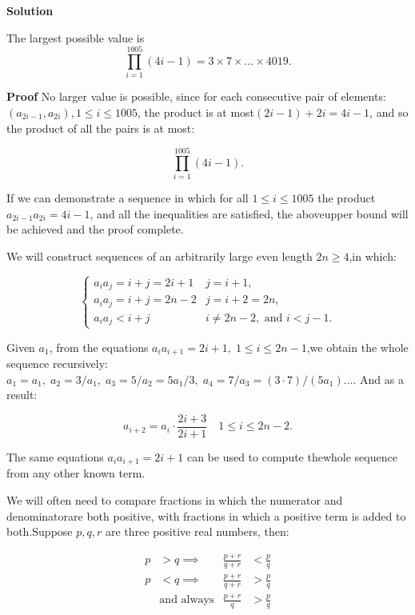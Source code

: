 \begin{enumerate}
 



\textbf{Solution}

The largest possible value is
 \[\prod_{i=1}^{1005}(4i-1) = 3\times 7 \times \ldots \times 4019.\]

 \textbf{Proof} No larger value is possible, since for each consecutive pair of elements:$(a_{2i-1},a_{2i}), 1\le i \le 1005$, the product is at most$(2i-1) + 2i = 4i - 1$, and so the product of all the pairs is at most:

 
 \[\prod_{i=1}^{1005}(4i-1).\]

 

 If we can demonstrate a sequence in which for all $1 \le i \le 1005$ the product$a_{2i-1}a_{2i} = 4i-1$, and all the inequalities are satisfied, the aboveupper bound will be achieved and the proof complete.

 We will construct sequences of an arbitrarily large even length $2n \ge 4$,in which:

 
 \[\begin{cases}   a_ia_j = i+j = 2i+1 & j=i+1, \\   a_ia_j = i+j = 2n-2 & j = i+2 = 2n, \\   a_ia_j < i+j            & i \ne 2n-2, \mbox{ and } i < j-1. \end{cases}\]

 

 Given $a_1$, from the equations $a_ia_{i+1} = 2i+1,\; 1\le i\le 2n-1$,we obtain the whole sequence recursively:$a_1 = a_1,\; a_2 = 3/a_1,\; a_3 = 5/a_2 = 5a_1/3,\; a_4 = 7/a_3 = (3\cdot 7)/(5a_1) \ldots.$ And as a result:

 
 \[a_{i+2} = a_i \cdot \frac{2i+3}{2i+1}\quad 1 \le i \le 2n-2.\]

 

 The same equations $a_ia_{i+1} = 2i+1$ can be used to compute thewhole sequence from any other known term.

 We will often need to compare fractions in which the numerator and denominatorare both positive, with fractions in which a positive term is added to both.Suppose $p, q, r$ are three positive real numbers, then:

 
 \begin{align*} p &> q \implies & \frac{p+r}{q+r} &< \frac{p}{q} \\ p &< q \implies & \frac{p+r}{q+r} &> \frac{p}{q} \\    &  \mbox{and always} & \frac{p+r}{q} &> \frac{p}{q} \end{align*}



\end{enumerate}
